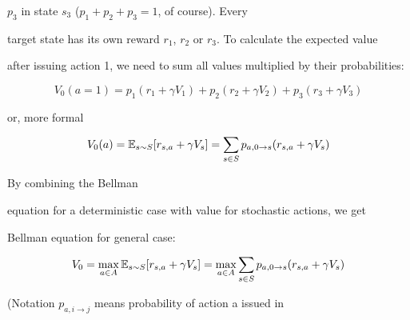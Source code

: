 \begin{math}p_3\end{math} in state \begin{math}s_3\end{math} (\begin{math}p_1+p_2+p_3=1\end{math}, of course). Every

target state has its own reward \begin{math}r_1\end{math}, \begin{math}r_2\end{math} or \begin{math}r_3\end{math}. To calculate the expected value

after issuing action 1, we need to sum all values multiplied by their probabilities:



\begin{equation*}

V_0(a=1) = p_1(r_1 + \gamma V_1) + p_2(r_2 + \gamma V_2) + p_3(r_3 + \gamma

V_3)

\end{equation*}


or, more formal


\begin{equation*}

V_0(a) = \E_{s \sim S}[r_{s,a} + \gamma V_s] = \sum_{s\in S} p_{a,0 \rightarrow s}(r_{s,a} + \gamma

V_s)

\end{equation*}


By combining the Bellman

equation for a deterministic case with value for stochastic actions, we get

Bellman equation for general case:


\begin{equation*}

V_0 = \max_{a \in A}\E_{s \sim S}[r_{s,a} + \gamma V_s] = \max_{a \in A} \sum_{s \in S}

p_{a,0 \rightarrow s}(r_{s,a} + \gamma V_s)

\end{equation*}


(Notation \begin{math}p_{a,i \rightarrow j}\end{math} means probability of action a issued in

